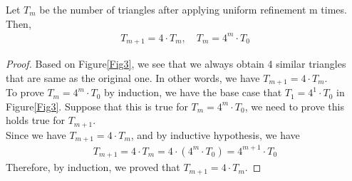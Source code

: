     \begin{lemma}
    Let $T_{m}$ be the number of triangles after applying uniform refinement m times. Then,
    \begin{align*}
    T_{m+1} = 4 \cdot T_{m}, \quad T_{m} = 4^m \cdot T_0
    \end{align*}
    \end{lemma}
    \begin{proof}
    Based on Figure\ref{Fig3}, we see that we always obtain 4 similar triangles that are same as the original one. In other words, we have $T_{m+1} = 4 \cdot T_{m}$.\\
    To prove $T_{m} = 4^m \cdot T_0$ by induction, we have the base case that $T_1 = 4^1 \cdot T_0$ in Figure\ref{Fig3}. Suppose that this is true for $T_{m} = 4^m \cdot T_0$, we need to prove this holds true for $T_{m+1}$.\\
    Since we have $T_{m+1} = 4 \cdot T_{m}$, and by inductive hypothesis, we have
    \begin{align*}
    T_{m+1} = 4 \cdot T_{m} = 4 \cdot (4^m\cdot T_0) = 4^{m+1}\cdot T_0
    \end{align*}
    Therefore, by induction, we proved that $T_{m+1} = 4 \cdot T_{m}$.
    \end{proof}

